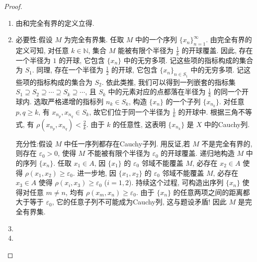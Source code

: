\documentclass[../../main.tex]{subfiles}%
\begin{document}
\begin{proof}
\begin{enumerate}[(1)]
\item 由和完全有界的定义立得.

\item {\heiti 必要性:}假设 \(M\) 为完全有界集. 任取 \(M\) 中的一个序列 \(\{x_n\}_{n=1}^{\infty}\).
由完全有界的定义可知, 对任意 \(k \in \mathbb{N}\), 集合 \(M\) 能被有限个半径为 \(\frac{1}{k}\) 的开球覆盖.
因此, 存在一个半径为 \(1\) 的开球, 它包含 \(\{x_n\}\) 中的无穷多项. 记这些项的指标构成的集合为 \(S_1\).
同理, 存在一个半径为 \(\frac{1}{2}\) 的开球, 它包含 \(\{x_n\}_{n \in S_1}\) 中的无穷多项. 记这些项的指标构成的集合为 \(S_2\).
依此类推, 我们可以得到一列嵌套的指标集 \(S_1 \supseteq S_2 \supseteq \cdots \supseteq S_k \supseteq \cdots\), 且 \(S_k\) 中的元素对应的点都落在半径为 \(\frac{1}{k}\) 的同一个开球内.
选取严格递增的指标列 \(n_k \in S_k\), 构造 \(\{x_n\}\) 的一个子列 \(\{x_{n_k}\}\). 对任意 \(p,q \geqslant k\), 有 \(x_{n_p},x_{n_q} \in S_k\), 故它们位于同一个半径为 \(\frac{1}{k}\) 的开球中. 根据三角不等式, 有 \(\rho(x_{n_p},x_{n_q}) < \frac{2}{k}\). 由于 \(k\) 的任意性, 这表明 \(\{x_{n_k}\}\) 是 \(X\) 中的Cauchy列.

{\heiti 充分性:}假设 \(M\) 中任一序列都存在Cauchy子列. 用反证,若 \(M\) 不是完全有界的, 则存在 \(\varepsilon_0 > 0\), 使得 \(M\) 不能被有限个半径为 \(\varepsilon_0\) 的开球覆盖.
递归地构造 \(M\) 中的序列 \(\{x_n\}\).
任取 \(x_1 \in A\), 因 \(\{x_1\}\) 的 \(\varepsilon_0\) 邻域不能覆盖 \(M\), 必存在 \(x_2 \in A\) 使得 \(\rho(x_1,x_2) \geqslant \varepsilon_0\).
进一步地, 因 \(\{x_1,x_2\}\) 的 \(\varepsilon_0\) 邻域不能覆盖 \(M\), 必存在 \(x_3 \in A\) 使得 \(\rho(x_i,x_3) \geqslant \varepsilon_0\) (\(i = 1,2\)).
持续这个过程, 可构造出序列 \(\{x_n\}\) 使得对任意 \(m \neq n\), 均有 \(\rho(x_m,x_n) \geqslant \varepsilon_0\).
由于 \(\{x_n\}\) 的任意两项之间的距离都大于等于 \(\varepsilon_0\), 它的任意子列不可能成为Cauchy列, 这与题设矛盾!
因此 \(M\) 是完全有界集. 

\item 

\item 
\end{enumerate}
\end{proof}
\end{document}

